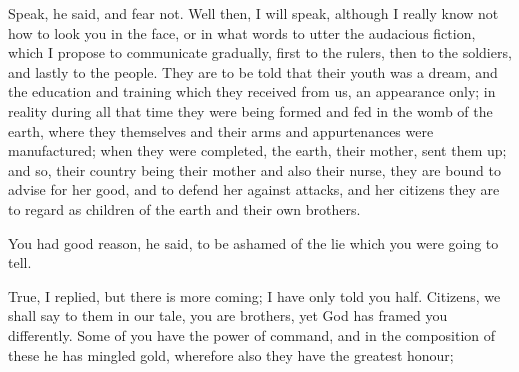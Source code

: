 Speak, he said, and fear not.
Well then, I will speak, although I really know not how to look you in the face, or in what words to utter the audacious fiction, which I propose to communicate gradually, first to the rulers, then to the soldiers, and lastly to the people. They are to be told that their youth was a dream, and the education and training which they received from us, an appearance only; in reality during all that time they were being formed and fed in the womb of the earth, where they themselves and their arms and appurtenances were manufactured; when they were completed, the earth, their mother, sent them up; and so, their country being their mother and also their nurse, they are bound to advise for her good, and to defend her against attacks, and her citizens they are to regard as children of the earth and their own brothers.

You had good reason, he said, to be ashamed of the lie which you were going to tell.

True, I replied, but there is more coming; I have only told you half. Citizens, we shall say to them in our tale, you are brothers, yet God has framed you differently. Some of you have the power of command, and in the composition of these he has mingled gold, wherefore also they have the greatest honour;